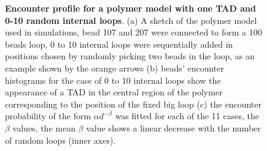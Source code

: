 \documentclass[12pt]{article}
\begin{document}
\begin{figure}[H]
\caption{\textbf{Encounter profile for a polymer model with one TAD and 0-10 random internal loops}. (a) A sketch of the polymer model used in simulations, bead 107 and 207 were connected to form a 100 beads loop, 0 to 10 internal loops were sequentially added in positions chosen by randomly picking two beads in the loop, as an example shown by the orange arrows (b) beads' encounter histograms for the case of 0 to 10 internal loops show the appearance of a TAD in the central region of the polymer corresponding to the position of the fixed big loop (c) the encounter probability of the form $\alpha d^{-\beta}$ was fitted for each of the 11 cases, the $\beta$ values, the mean $\beta$ value shows a linear decrease with the number of random loops (inner axes).}
\label{figure_encounterProfileOneTADWithTails}
\end{figure}
\end{document}
